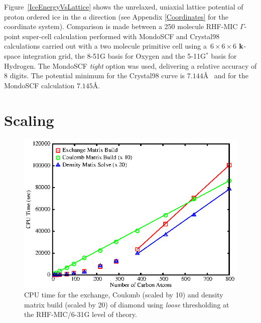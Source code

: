 \documentclass[prb,aps,nobibnotes,twocolumn,doublespace,twocolumngrid,superbib]{revtex4}
\begin{document}
Figure~\ref{IceEnergyVsLattice} shows the unrelaxed, uniaxial lattice potential of 
proton ordered ice \cite{} in the $a$ direction (see Appendix \ref{Coordinates} for the coordinate system).  
Comparison is made between a 250 molecule RHF-MIC $\Gamma$-point super-cell calculation performed 
with {\sc MondoSCF} and {\sc Crystal98} calculations carried out with a two molecule primitive
cell using a~$6\times6\times6$ ${\bf k}$-space integration grid, the 8-51G basis for Oxygen and the 
5-11G${^*}$ basis for Hydrogen.  The {\sc MondoSCF} {\it tight} option was used, delivering 
a relative accuracy of 8 digits. The potential minimum for the {\sc Crystal98} curve is $7.144$\AA~
and  for the {\sc MondoSCF} calculation $7.145$\AA.


\section{Scaling}


\begin{figure}[h]
\caption{CPU time for the exchange, Coulomb (scaled by 10)  and density 
matrix build (scaled by 20) of diamond using {\it loose} thresholding 
at the RHF-MIC/6-31G level of theory.}
\label{DiamondScaling}
{\centering \includegraphics{Timing_Diamond_ONX.ps} \par}
\end{figure}
\end{document}
